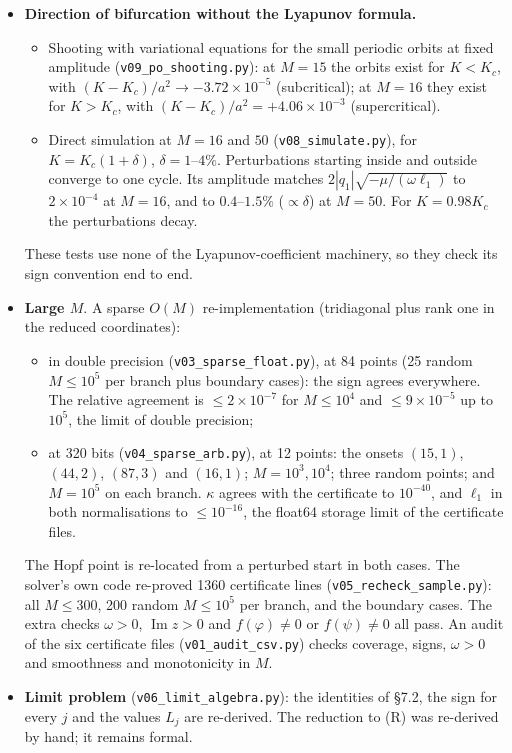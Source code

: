 \documentclass[11pt,a4paper]{report}
\begin{document}
\begin{itemize}
\begin{itemize}
  \end{itemize}
  For \(M\ge58\) the computation exceeded the memory allotted.
\item
  \textbf{Direction of bifurcation without the Lyapunov formula.}
  \begin{itemize}
  \tightlist
  \item Shooting with variational equations for the small periodic orbits at fixed amplitude
  (\texttt{v09\_po\_shooting.py}): at \(M=15\) the orbits exist for \(K<K_c\), with \((K-K_c)/a^2\to-3.72\times10^{-5}\)
  (subcritical); at \(M=16\) they exist for \(K>K_c\), with \((K-K_c)/a^2=+4.06\times10^{-3}\) (supercritical).
  \item Direct simulation at \(M=16\) and \(50\) (\texttt{v08\_simulate.py}), for \(K=K_c(1+\delta)\),
  \(\delta=1\)--\(4\%\). Perturbations starting inside and outside converge to one cycle. Its amplitude matches
  \(2|q_1|\sqrt{-\mu/(\omega\ell_1)}\) to \(2\times10^{-4}\) at \(M=16\), and to \(0.4\)--\(1.5\%\) (\(\propto\delta\))
  at \(M=50\). For \(K=0.98K_c\) the perturbations decay.
  \end{itemize}
  These tests use none of the Lyapunov-coefficient machinery, so they check its sign convention end to end.
\item
  \textbf{Large \(M\)}. A sparse \(O(M)\) re-implementation (tridiagonal plus rank one in the reduced coordinates):
  \begin{itemize}
  \tightlist
  \item in double precision (\texttt{v03\_sparse\_float.py}), at 84 points (25 random \(M\le10^5\) per branch plus
  boundary cases): the sign agrees everywhere. The relative agreement is \(\le2\times10^{-7}\) for \(M\le10^4\) and
  \(\le9\times10^{-5}\) up to \(10^5\), the limit of double precision;
  \item at 320 bits (\texttt{v04\_sparse\_arb.py}), at 12 points: the onsets \((15,1)\), \((44,2)\), \((87,3)\) and
  \((16,1)\); \(M=10^3,10^4\); three random points; and \(M=10^5\) on each branch. \(\kappa\) agrees with the
  certificate to \(10^{-40}\), and \(\ell_1\) in both normalisations to \(\le10^{-16}\), the float64 storage limit of
  the certificate files.
  \end{itemize}
  The Hopf point is re-located from a perturbed start in both cases. The solver's own code re-proved 1360 certificate
  lines (\texttt{v05\_recheck\_sample.py}): all \(M\le300\), 200 random \(M\le10^5\) per branch, and the boundary
  cases. The extra checks \(\omega>0\), \(\operatorname{Im}z>0\) and \(f(\varphi)\ne0\) or \(f(\psi)\ne0\) all pass.
  An audit of the six certificate files (\texttt{v01\_audit\_csv.py}) checks coverage, signs, \(\omega>0\) and
  smoothness and monotonicity in \(M\).
\item
  \textbf{Limit problem} (\texttt{v06\_limit\_algebra.py}): the identities of §7.2, the sign for every \(j\) and the
  values \(L_j\) are re-derived. The reduction to (R) was re-derived by hand; it remains formal.
\end{itemize}
\end{document}
